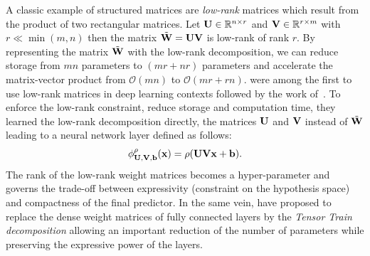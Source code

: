 \drawstar

A classic example of structured matrices are \emph{low-rank} matrices which result from the product of two rectangular matrices.
Let $\mathbf{U} \in \mathbb{R}^{n \times r}$ and $\mathbf{V} \in \mathbb{R}^{r \times m}$ with $r \ll \min(m, n)$ then the matrix $\tilde{\mathbf{W}} = \mathbf{U} \mathbf{V}$ is low-rank of rank $r$.  
By representing the matrix $\tilde{\mathbf{W}}$ with the low-rank decomposition, we can reduce storage from $mn$ parameters to $(mr + nr)$ parameters and accelerate the matrix-vector product from $\mathcal{O}(mn)$ to $\mathcal{O}(mr + rn)$.
\citet{sainath2013lowrank} were among the first to use low-rank matrices in deep learning contexts followed by the work of~\citet{jaderberg2014speeding,yu2017compressing}.
To enforce the low-rank constraint, reduce storage and computation time, they learned the low-rank decomposition directly, \ie the matrices $\mathbf{U}$ and $\mathbf{V}$ instead of $\tilde{\mathbf{W}}$ leading to a neural network layer defined as follows:
\begin{equation}
  \phi^\rho_{\Umat, \Vmat, \bvec} (\xvec) = \rho\left( \Umat \Vmat \xvec + \bvec \right) .
\end{equation}
The rank of the low-rank weight matrices becomes a hyper-parameter and governs the trade-off between expressivity (\ie constraint on the hypothesis space) and compactness of the final predictor. 
In the same vein, \citet{novikov2015tensorizing} have proposed to replace the dense weight matrices of fully connected layers by the \emph{Tensor Train decomposition} allowing an important reduction of the number of parameters while preserving the expressive power of the layers.


%
%

